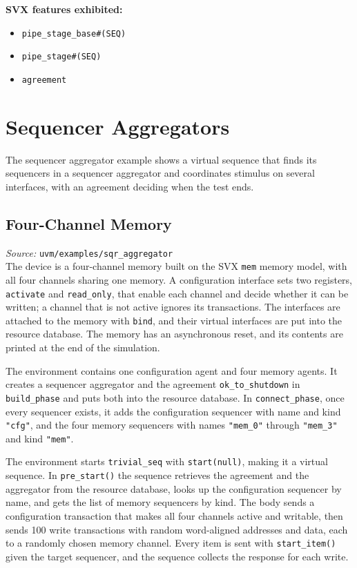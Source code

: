\documentclass[11pt,letterpaper]{report}
\begin{document}
\textbf{SVX features exhibited:}

\begin{itemize}
  \item \texttt{pipe\_stage\_base\#(SEQ)}
  \item \texttt{pipe\_stage\#(SEQ)}
  \item \texttt{agreement}
\end{itemize}
\chapter{Sequencer Aggregators}

The sequencer aggregator example shows a virtual sequence that finds its sequencers in a sequencer aggregator and coordinates stimulus on several interfaces, with an agreement deciding when the test ends.

\section{Four-Channel Memory}

\textit{Source:} \texttt{uvm/examples/sqr\_aggregator}\\

The device is a four-channel memory built on the SVX \texttt{mem} memory model, with all four channels sharing one memory. A configuration interface sets two registers, \texttt{activate} and \texttt{read\_only}, that enable each channel and decide whether it can be written; a channel that is not active ignores its transactions. The interfaces are attached to the memory with \texttt{bind}, and their virtual interfaces are put into the resource database. The memory has an asynchronous reset, and its contents are printed at the end of the simulation.

The environment contains one configuration agent and four memory agents. It creates a sequencer aggregator and the agreement \texttt{ok\_to\_shutdown} in \texttt{build\_phase} and puts both into the resource database. In \texttt{connect\_phase}, once every sequencer exists, it adds the configuration sequencer with name and kind \texttt{"cfg"}, and the four memory sequencers with names \texttt{"mem\_0"} through \texttt{"mem\_3"} and kind \texttt{"mem"}.

The environment starts \texttt{trivial\_seq} with \texttt{start(null)}, making it a virtual sequence. In \texttt{pre\_start()} the sequence retrieves the agreement and the aggregator from the resource database, looks up the configuration sequencer by name, and gets the list of memory sequencers by kind. The body sends a configuration transaction that makes all four channels active and writable, then sends 100 write transactions with random word-aligned addresses and data, each to a randomly chosen memory channel. Every item is sent with \texttt{start\_item()} given the target sequencer, and the sequence collects the response for each write.
\end{document}
